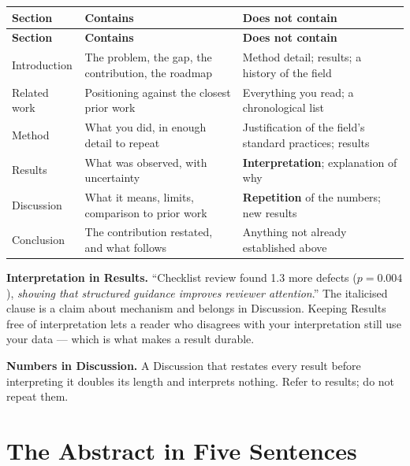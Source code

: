 \begin{center}
\small
\begin{longtable}{@{}L{2.8cm}L{5.2cm}L{6.2cm}@{}}
\toprule
\textbf{Section} & \textbf{Contains} & \textbf{Does not contain} \\
\midrule
\endfirsthead
\toprule
\textbf{Section} & \textbf{Contains} & \textbf{Does not contain} \\
\midrule
\endhead
\bottomrule
\endfoot
Introduction
  & The problem, the gap, the contribution, the roadmap
  & Method detail; results; a history of the field \\
Related work
  & Positioning against the closest prior work
  & Everything you read; a chronological list \\
Method
  & What you did, in enough detail to repeat
  & Justification of the field's standard practices; results \\
Results
  & What was observed, with uncertainty
  & \textbf{Interpretation}; explanation of why \\
Discussion
  & What it means, limits, comparison to prior work
  & \textbf{Repetition} of the numbers; new results \\
Conclusion
  & The contribution restated, and what follows
  & Anything not already established above \\
\end{longtable}
\end{center}

\begin{alertbox}
\textbf{Interpretation in Results.} ``Checklist review found 1.3 more defects
($p = 0.004$), \emph{showing that structured guidance improves reviewer
attention}.'' The italicised clause is a claim about mechanism and belongs in
Discussion. Keeping Results free of interpretation lets a reader who disagrees
with your interpretation still use your data --- which is what makes a result
durable.

\medskip
\textbf{Numbers in Discussion.} A Discussion that restates every result before
interpreting it doubles its length and interprets nothing. Refer to results;
do not repeat them.
\end{alertbox}

\section{The Abstract in Five Sentences}

